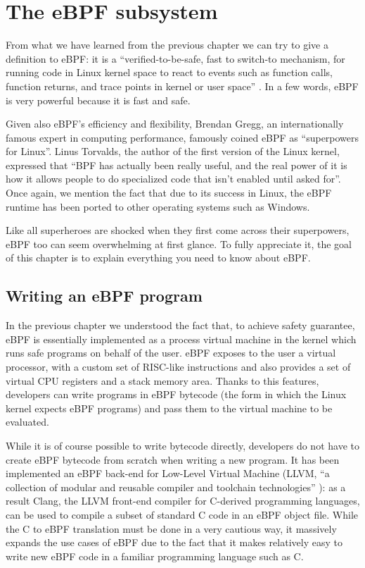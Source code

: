 \chapter{The eBPF subsystem}

From what we have learned from the previous chapter we can try to give a definition to eBPF: it is a ``verified-to-be-safe, fast to switch-to mechanism, for running code in Linux kernel space to react to events such as function calls, function returns, and trace points in kernel or user space'' \cite{eBPFLinuxJournal}.
In a few words, eBPF is very powerful because it is fast and safe. 

Given also eBPF's efficiency and flexibility, Brendan Gregg, an internationally famous expert in computing performance,  famously coined eBPF as ``superpowers for Linux''.
Linus Torvalds, the author of the first version of the Linux kernel, expressed that ``BPF has actually been really useful, and the real power of it is how it allows people to do specialized code that isn't enabled until asked for''.
Once again, we mention the fact that due to its success in Linux, the eBPF runtime has been ported to other operating systems such as Windows.

Like all superheroes are shocked when they first come across their superpowers, eBPF too can seem overwhelming at first glance.
To fully appreciate it, the goal of this chapter is to explain everything you need to know about eBPF.

\section{Writing an eBPF program}

In the previous chapter we understood the fact that, to achieve safety guarantee, eBPF is essentially implemented as a process virtual machine in the kernel which runs safe programs on behalf of the user.
eBPF exposes to the user a virtual processor, with a custom set of RISC-like instructions and also provides a set of virtual CPU registers and a stack memory area.
Thanks to this features, developers can write programs in eBPF bytecode (the form in which the Linux kernel expects eBPF programs) and pass them to the virtual machine to be evaluated.

While it is of course possible to write bytecode directly, developers do not have to create eBPF bytecode from scratch when writing a new program.
It has been implemented an eBPF back-end for Low-Level Virtual Machine (LLVM, ``a collection of modular and reusable compiler and toolchain technologies'' \cite{LLVMWebsite}): as a result Clang, the LLVM front-end compiler for C-derived programming languages, can be used to compile a subset of standard C code in an eBPF object file.
While the C to eBPF translation must be done in a very cautious way, it massively expands the use cases of eBPF due to the fact that it makes relatively easy to write new eBPF code in a familiar programming language such as C.

